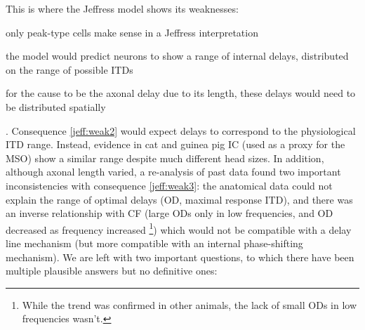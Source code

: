 \documentclass[11pt,a4paper]{article}
\begin{document}
This is where the Jeffress model shows its weaknesses: 
\begin{inlinelist}
    \item only peak-type cells make sense in a Jeffress interpretation
    \item\label{jeff:weak2} the model would predict neurons to show a range of internal delays, distributed on the range of possible ITDs
    \item\label{jeff:weak3} for the cause to be the axonal delay due to its length, these delays would need to be distributed spatially
\end{inlinelist}. Consequence \ref{jeff:weak2} would expect delays to correspond to the physiological ITD range. Instead, evidence in cat \cite{yinInterauralTimeSensitivity1990a} and guinea pig \cite{mcalpineNeuralCodeLowfrequency2001} IC (used as a proxy for the MSO) show a similar range despite much different head sizes. In addition, although axonal length varied, a re-analysis of past data \cite{karinoAxonalBranchingPatterns2011} found two important inconsistencies with consequence \ref{jeff:weak3}: the anatomical data could not explain the range of optimal delays (OD, maximal response ITD), and there was an inverse relationship with CF (large ODs only in low frequencies, and OD decreased as frequency increased \cite{mcalpineNeuralCodeLowfrequency2001}\footnote{While the trend was confirmed in other animals, the lack of small ODs in low frequencies wasn't.}) which would not be compatible with a delay line mechanism (but more compatible with an internal phase-shifting mechanism). We are left with two important questions, to which there have been multiple plausible answers but no definitive ones:
\end{document}
